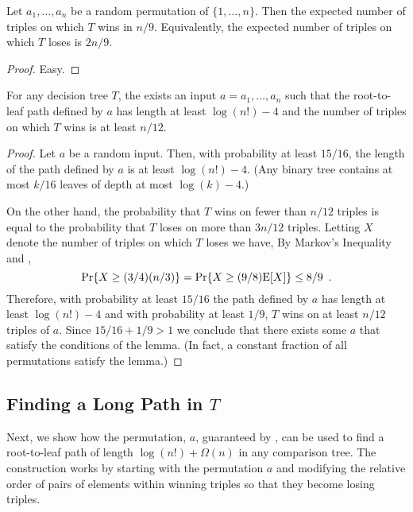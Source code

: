 \documentclass{patmorin}
\begin{document}
\begin{lem}
  Let $a_1,\ldots,a_n$ be a random permutation of $\{1,\ldots,n\}$.
  Then the expected number of triples on which $T$ wins in $n/9$.
  Equivalently, the expected number of triples on which $T$ loses
  is $2n/9$.
\end{lem}

\begin{proof}
Easy.
\end{proof}

\begin{lem}
  For any decision tree $T$, the exists an input $a=a_1,\ldots,a_n$
  such that the root-to-leaf path defined by $a$ has length at least
  $\log(n!)-4$ and the number of triples on which $T$ wins is at least
  $n/12$.
\end{lem}

\begin{proof}
Let $a$ be a random input.  Then, with probability at least $15/16$, the
length of the path defined by $a$ is at least $\log(n!)-4$.  (Any binary
tree contains at most $k/16$ leaves of depth at most $\log(k)-4$.)

On the other hand, the probability that $T$ wins on fewer than $n/12$
triples is equal to the probability that $T$ loses on more than $3n/12$
triples.  Letting $X$ denote the number of triples on which $T$ loses
we have, By Markov's Inequality and ,
\[
   \Pr\{X\ge (3/4)(n/3)\} = \Pr\{X \ge (9/8)\mathrm{E}[X]\} \le 8/9 \enspace . 
\]
Therefore, with probability at least $15/16$ the path defined by $a$
has length at least $\log(n!)-4$ and with probability at least $1/9$, $T$
wins on at least $n/12$ triples of $a$.  Since $15/16+1/9 > 1$ we conclude
that there exists some $a$ that satisfy the conditions of the lemma. (In
fact, a constant fraction of all permutations satisfy the lemma.)
\end{proof}

\subsection{Finding a Long Path in $T$}

Next, we show how the permutation, $a$, guaranteed by
, can be used to find a root-to-leaf path of length
$\log(n!)+\Omega(n)$ in any comparison tree.  The construction works
by starting with the permutation $a$ and modifying the relative order
of pairs of elements within winning triples so that they become losing
triples.
\end{document}
